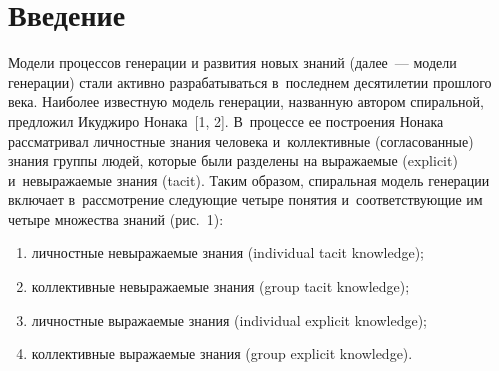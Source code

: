 {   



\vspace*{-6pt}


\thispagestyle{headings}

\begin{multicols}{2}

\label{st\stat}

\section{Введение}

      Модели процессов генерации и развития новых знаний (далее~--- модели генерации) 
стали активно разрабатываться в~последнем десятилетии прошлого века. Наиболее 
известную модель генерации, названную автором спиральной, предложил Икуджиро 
Нонака~[1, 2]. В~процессе ее построения Нонака рассматривал личностные знания человека 
и~коллективные (согласованные) знания группы людей, которые были разделены на 
выражаемые (explicit) и~невыражаемые знания (tacit). Таким образом, спиральная 
модель генерации включает в~рассмотрение следующие четыре понятия и~соответствующие 
им четыре множества знаний (рис.~1):
      \begin{enumerate}[(1)]
\item личностные невыражаемые знания (individual tacit knowledge);\\[-15pt]
\item коллективные невыражаемые знания (group tacit knowledge);\\[-15pt]
\item личностные выражаемые знания (individual explicit knowledge);\\[-15pt]
\item коллективные выражаемые знания (group explicit knowledge).
\end{enumerate}

\begin{figure*} %
       \vspace*{1pt}
 \begin{center}
 \mbox{%
 \epsfxsize=87.663mm 
 }
 \end{center}
 \vspace*{-12pt}
\vspace*{-4pt}
\end{figure*}



\end{multicols}}
